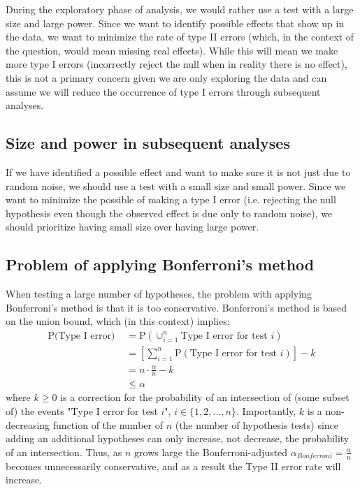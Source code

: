\documentclass[paper=a4, fontsize=11pt]{scrartcl} %
\numberwithin{equation}{section} %
\numberwithin{figure}{section} %
\numberwithin{table}{section} %
\begin{document}
During the exploratory phase of analysis, we would rather use a test with a large size and large power. Since we want to identify possible effects that show up in the data, we want to minimize the rate of type II errors (which, in the context of the question, would mean missing real effects). While this will mean we make more type I errors (incorrectly reject the null when in reality there is no effect), this is not a primary concern given we are only exploring the data and can assume we will reduce the occurrence of type I errors through subsequent analyses. 

\subsection{Size and power in subsequent analyses}

If we have identified a possible effect and want to make sure it is not just due to random noise, we should use a test with a small size and small power. Since we want to minimize the possible of making a type I error (i.e. rejecting the null hypothesis even though the observed effect is due only to random noise), we should prioritize having small size over having large power.

\subsection{Problem of applying Bonferroni's method}

When testing a large number of hypotheses, the problem with applying Bonferroni's method is that it is too conservative. Bonferroni's method is based on the union bound, which (in this context) implies:
\begin{align*}
\textrm{P(Type I error) } &= \textrm{P}(\cup_{i=1}^n \textrm{Type I error for test } i) \\
   &= \left[\sum_{i=1}^{n} \textrm{P}(\textrm{Type I error for test } i)\right] - k \\
   &=n \cdot \frac{\alpha}{n} - k \\
   &\leq \alpha
\end{align*}
where $k\geq0$ is a correction for the probability of an intersection of (some subset of) the events "Type I error for test $i$", $i \in \{1, 2, ..., n \}$. Importantly, $k$ is a non-decreasing function of the number of  $n$ (the number of hypothesis tests) since adding an additional hypotheses can only increase, not decrease, the probability of an intersection. Thus, as $n$ grows large the Bonferroni-adjusted $\alpha_{Bonferroni} = \frac{\alpha}{n}$ becomes unnecessarily conservative, and as a result the Type II error rate will increase.
\end{document}
